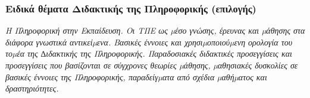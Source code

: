 \hypertarget{ux3b5ux3b9ux3b4ux3b9ux3baux3ac-ux3b8ux3adux3bcux3b1ux3c4ux3b1-ux3b4ux3b9ux3b4ux3b1ux3baux3c4ux3b9ux3baux3aeux3c2-ux3c4ux3b7ux3c2-ux3c0ux3bbux3b7ux3c1ux3bfux3c6ux3bfux3c1ux3b9ux3baux3aeux3c2-ux3b5ux3c0ux3b9ux3bbux3bfux3b3ux3aeux3c2}{%
\subsubsection{Ειδικά θέματα Διδακτικής της Πληροφορικής
(επιλογής)}\label{ux3b5ux3b9ux3b4ux3b9ux3baux3ac-ux3b8ux3adux3bcux3b1ux3c4ux3b1-ux3b4ux3b9ux3b4ux3b1ux3baux3c4ux3b9ux3baux3aeux3c2-ux3c4ux3b7ux3c2-ux3c0ux3bbux3b7ux3c1ux3bfux3c6ux3bfux3c1ux3b9ux3baux3aeux3c2-ux3b5ux3c0ux3b9ux3bbux3bfux3b3ux3aeux3c2}}

\emph{Η Πληροφορική στην Εκπαίδευση. Οι ΤΠΕ ως µέσο γνώσης, έρευνας και
µάθησης στα διάφορα γνωστικά αντικείµενα. Βασικές έννοιες και
χρησιµοποιούµενη ορολογία του τοµέα της ∆ιδακτικής της Πληροφορικής.
Παραδοσιακές διδακτικές προσεγγίσεις και προσεγγίσεις που βασίζονται σε
σύγχρονες θεωρίες µάθησης, µαθησιακές δυσκολίες σε βασικές έννοιες της
Πληροφορικής, παραδείγµατα από σχέδια µαθήµατος και δραστηριότητες.}
